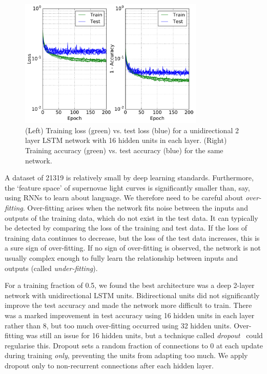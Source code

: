 \documentclass[twocolumn]{aastex61}
\begin{document}
\begin{figure}
\centering
\includegraphics[width=88mm, angle=0]{f3.pdf}
\caption{\label{fig:loss} (Left) Training loss (green) vs. test loss (blue) for a unidirectional 2 layer LSTM network with 16 hidden units in each layer. (Right) Training accuracy (green) vs. test accuracy (blue) for the same network.  }
\end{figure}

A dataset of 21319 is relatively small by deep learning standards. Furthermore, the `feature space' of supernovae light curves is significantly smaller than, say, using RNNs to learn about language. We therefore need to be careful about {\em over-fitting}. Over-fitting arises when the network fits noise between the inputs and outputs of the training data, which do not exist in the test data. It can typically be detected by comparing the loss of the training and test data. If the loss of training data continues to decrease, but the loss of the test data increases, this is a sure sign of over-fitting. If no sign of over-fitting is observed, the network is not usually complex enough to fully learn the relationship between inputs and outputs (called {\em under-fitting}).  

For a training fraction of 0.5, we found the best architecture was a deep 2-layer network with unidirectional LSTM units. Bidirectional units did not significantly improve the test accuracy and made the network more difficult to train. There was a marked improvement in test accuracy using 16 hidden units in each layer rather than 8, but too much over-fitting occurred using 32 hidden units. Over-fitting was still an issue for 16 hidden units,  but a technique called {\em dropout}~\cite{JMLR:v15:srivastava14a} could regularise this. Dropout sets a random fraction of connections to 0 at each update during training {\em only}, preventing the units from adapting too much. We apply dropout only to non-recurrent connections after each hidden layer. 
\end{document}
